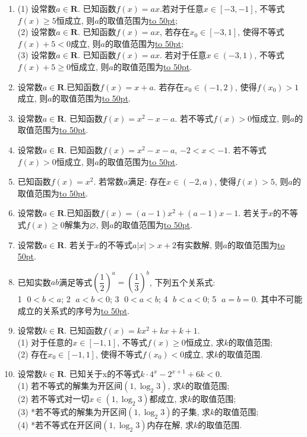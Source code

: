\documentclass[10pt,a4paper]{article}
\newcommand{\blank}[1]{\underline{\hbox to #1pt{}}}
\begin{document}
\begin{enumerate}[1.]
\item (1) 设常数$a\in \mathbf{R}$. 已知函数$f(x)=ax$.若对于任意$x\in [-3,-1]$, 不等式$f(x)\ge 5$恒成立, 则$a$的取值范围为\blank{50};\\
(2) 设常数$a\in \mathbf{R}$. 已知函数$f(x)=ax$, 若存在$x_0\in [-3,1]$, 使得不等式$f(x)+5<0$成立, 则$a$的取值范围为\blank{50};\\
(3) 设常数$a\in \mathbf{R}$. 已知函数$f(x)=ax$. 若对于任意$x\in (-3,1)$, 不等式$f(x)+5\ge 0$恒成立, 则$a$的取值范围为\blank{50}.
\item 设常数$a\in \mathbf{R}$.已知函数$f(x)=x+a$. 若存在$x_0\in (-1,2)$, 使得$f(x_0)>1$成立, 则$a$的取值范围为\blank{50}.
\item 设常数$a\in \mathbf{R}$. 已知函数$f(x)=x^2-x-a$. 若不等式$f(x)>0$恒成立, 则$a$的取值范围为\blank{50}.
\item 设常数$a\in \mathbf{R}$. 已知函数$f(x)=x^2-x-a$, $-2<x<-1$. 若不等式$f(x)>0$恒成立, 则$a$的取值范围为\blank{50}.
\item 已知函数$f(x)=x^2$. 若常数$a$满足: 存在$x\in (-2,a)$, 使得$f(x)>5$, 则$a$的取值范围为\blank{50}.
\item 设常数$a\in \mathbf{R}$.已知函数$f(x)=(a-1)x^2+(a-1)x-1$. 若关于$x$的不等式$f(x)\ge 0$解集为$\varnothing$, 则$a$的取值范围为\blank{50}.
\item 设常数$a\in \mathbf{R}$. 若关于$x$的不等式$a|x|>x+2$有实数解, 则$a$的取值范围为\blank{50}.
\item 已知实数$ab$满足等式$(\dfrac 12)^a=(\dfrac 13)^b$, 下列五个关系式:\\
\textcircled{1} $0<b<a$; \textcircled{2} $a<b<0$; \textcircled{3} $0<a<b$; \textcircled{4} $b<a<0$; \textcircled{5} $a=b=0$. 其中不可能成立的关系式的序号为\blank{50}.
\item 设常数$k\in \mathbf{R}$. 已知函数$f(x)=kx^2+kx+k+1$.\\
(1) 对于任意的$x\in [-1,1]$, 不等式$f(x)\ge 0$恒成立, 求$k$的取值范围;\\
(2) 存在$x_0\in [-1,1]$, 使得不等式$f(x_0)<0$成立, 求$k$的取值范围.
\item 设常数$k\in \mathbf{R}$. 已知关于x的不等式$k\cdot 4^x-2^{x+1}+6k<0$.\\
(1) 若不等式的解集为开区间$(1, \log_2 3)$, 求$k$的取值范围;\\
(2) 若不等式对一切$x\in (1,\log_2 3)$都成立, 求$k$的取值范围;\\
(3) *若不等式的解集为开区间$(1,\log_2 3)$的子集, 求$k$的取值范围;\\
(4) *若不等式在开区间$(1,\log_2 3)$内存在解, 求$k$的取值范围.

\end{enumerate}
\end{document}
